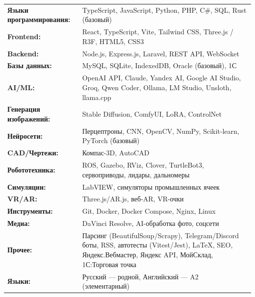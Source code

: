 \documentclass[10pt,a4paper]{article}
\begin{document}
\begin{tabular}{p{3.5cm} p{12cm}}
    \textbf{Языки программирования:} & TypeScript, JavaScript, Python, PHP, C\#, SQL, Rust (базовый) \\
    \textbf{Frontend:} & React, TypeScript, Vite, Tailwind CSS, Three.js / R3F, HTML5, CSS3 \\
    \textbf{Backend:} & Node.js, Express.js, Laravel, REST API, WebSocket \\
    \textbf{Базы данных:} & MySQL, SQLite, IndexedDB, Oracle (базовый), 1С \\
    \textbf{AI/ML:} & OpenAI API, Claude, Yandex AI, Google AI Studio, Groq, Qwen Coder, Ollama, LM Studio, Unsloth, llama.cpp \\
    \textbf{Генерация изображений:} & Stable Diffusion, ComfyUI, LoRA, ControlNet \\
    \textbf{Нейросети:} & Перцептроны, CNN, OpenCV, NumPy, Scikit-learn, PyTorch (базовый) \\
    \textbf{CAD/Чертежи:} & Компас-3D, AutoCAD \\
    \textbf{Робототехника:} & ROS, Gazebo, RViz, Clover, TurtleBot3, сервоприводы, лидары, дальномеры \\
    \textbf{Симуляции:} & LabVIEW, симуляторы промышленных ячеек \\
    \textbf{VR/AR:} & Three.js/AR.js, веб-AR, VR-очки \\
    \textbf{Инструменты:} & Git, Docker, Docker Compose, Nginx, Linux \\
    \textbf{Медиа:} & DaVinci Resolve, AI-обработка фото, соцсети \\
    \textbf{Прочее:} & Парсинг (BeautifulSoup/Scrapy), Telegram/Discord боты, RSS, автотесты (Vitest/Jest), LaTeX, SEO, Яндекс.Вебмастер, Яндекс API, МойСклад, 1С:Торговая точка \\
    \textbf{Языки:} & Русский — родной, Английский — A2 (элементарный)
\end{tabular}

\end{document}
